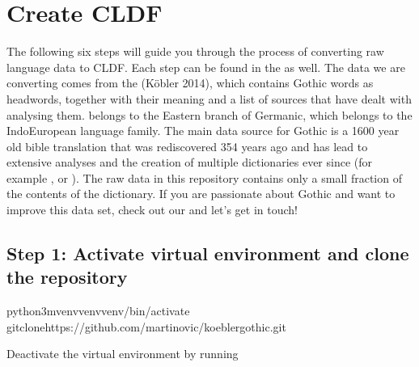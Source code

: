 \documentclass[letterpaper,10pt,english]{sphinxmanual}
\begin{document}
{{{{\sphinxstepscope


\chapter{Create CLDF}
\label{\detokenize{mkcldf:create-cldf}}\label{\detokenize{mkcldf::doc}}
\sphinxAtStartPar
The following six steps will guide you through the process of
converting raw language data to CLDF. Each step can be found in the
as well. The data we are converting comes from
the  (Köbler 2014),
which contains Gothic words as headwords, together with their
meaning and a list of sources that have dealt with analysing them.
 belongs to the
Eastern branch of Germanic, which belongs to the
Indo\sphinxhyphen{}European language family. The main data source for Gothic is a
1600 year old bible translation that was rediscovered 354 years ago and has
lead to extensive analyses and the creation of multiple dictionaries ever
since (for example , or ).
The raw data in this repository contains
only a small fraction of the contents of the dictionary.
If you are passionate about Gothic and want to improve this data
set, check out our 
and let’s get in touch!


\section{Step 1: Activate virtual environment and clone the repository}
\label{\detokenize{mkcldf:step-1-activate-virtual-environment-and-clone-the-repository}}
\begin{sphinxVerbatim}[commandchars=\\\{\}]
python3\PYGZhy{}mvenvvenvvenv/bin/activate
gitclonehttps://github.com/martino\PYGZhy{}vic/koeblergothic.git
\end{sphinxVerbatim}

\sphinxAtStartPar
Deactivate the virtual environment by running

}}}}
\end{document}
